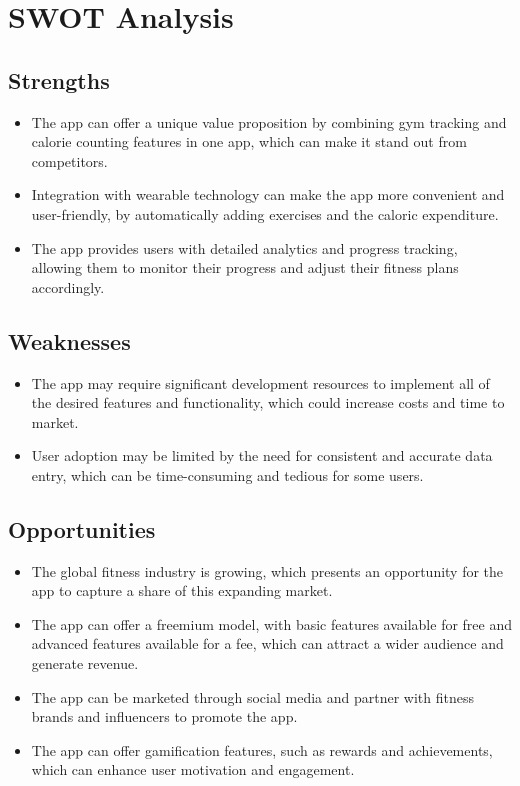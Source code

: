 \section{SWOT Analysis}

\subsection{Strengths}
\begin{itemize}
  \item The app can offer a unique value proposition by combining gym tracking and calorie counting features in one app, which can make it stand out from competitors.
  \item Integration with wearable technology can make the app more convenient and user-friendly, by automatically adding exercises and the caloric expenditure.
  \item The app provides users with detailed analytics and progress tracking, allowing them to monitor their progress and adjust their fitness plans accordingly.
\end{itemize}

\subsection{Weaknesses}
\begin{itemize}
  \item The app may require significant development resources to implement all of the desired features and functionality, which could increase costs and time to market.
  \item User adoption may be limited by the need for consistent and accurate data entry, which can be time-consuming and tedious for some users.
\end{itemize}

\subsection{Opportunities}
\begin{itemize}
  \item The global fitness industry is growing, which presents an opportunity for the app to capture a share of this expanding market.
  \item The app can offer a freemium model, with basic features available for free and advanced features available for a fee, which can attract a wider audience and generate revenue.
  \item The app can be marketed through social media and partner with fitness brands and influencers to promote the app.
  \item The app can offer gamification features, such as rewards and achievements, which can enhance user motivation and engagement.
\end{itemize}


